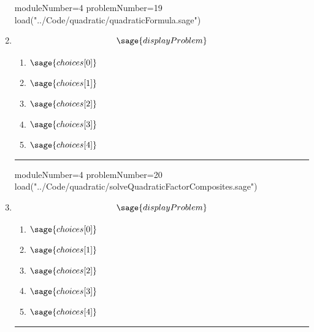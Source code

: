 \documentclass[14pt]{article}
\newcommand{\litem}[1]{\item#1\hspace*{-1cm}\rule{\textwidth}{0.4pt}}
\begin{document}
\begin{enumerate}
\begin{sagesilent}
moduleNumber=4
problemNumber=19
load("../Code/quadratic/quadraticFormula.sage")
\end{sagesilent}

\litem{ 
	\[ \sage{displayProblem} \]

	\begin{enumerate}[label=\Alph*.]
    \item \( \sage{choices[0]} \)
    \item \( \sage{choices[1]} \)
    \item \( \sage{choices[2]} \)
    \item \( \sage{choices[3]} \)
    \item \( \sage{choices[4]} \)
	\end{enumerate}
}

\begin{sagesilent}
moduleNumber=4
problemNumber=20
load("../Code/quadratic/solveQuadraticFactorComposites.sage")
\end{sagesilent}

\litem{ 

	\[ \sage{displayProblem} \]

	\begin{enumerate}[label=\Alph*.]
    \item \( \sage{choices[0]} \)
    \item \( \sage{choices[1]} \)
    \item \( \sage{choices[2]} \)
    \item \( \sage{choices[3]} \)
    \item \( \sage{choices[4]} \)
	\end{enumerate}
}

\end{enumerate}
\end{document}
